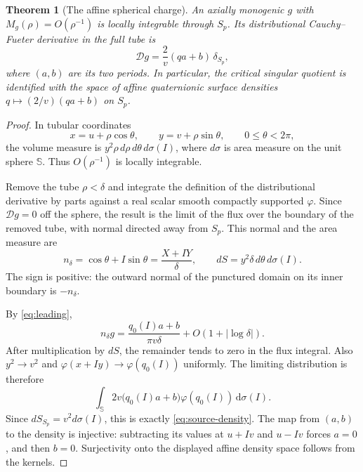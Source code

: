\documentclass[11pt,a4paper]{article}
\numberwithin{equation}{section}
\newtheorem{theorem}{Theorem}[section]
\theoremstyle{definition}
\theoremstyle{remark}
\newcommand{\SSS}{\mathbb S}
\newcommand{\cD}{\mathcal D}
\newcommand{\dd}{\,\mathrm d}
\begin{document}
\begin{theorem}[The affine spherical charge]\label{thm:source}
An axially monogenic $g$ with $M_g(\rho)=O(\rho^{-1})$ is locally integrable
through $S_p$. Its distributional Cauchy--Fueter derivative in the full tube is
\begin{equation}\label{eq:source-density}
 \boxed{\displaystyle
 \cD g=\frac{2}{v}(q a+b)\,\delta_{S_p},}
\end{equation}
where $(a,b)$ are its two periods. In particular, the critical singular quotient
is identified with the space of affine quaternionic surface densities
$q\mapsto(2/v)(qa+b)$ on $S_p$.
\end{theorem}
\begin{proof}
In tubular coordinates
\[
 x=u+\rho\cos\theta,\qquad y=v+\rho\sin\theta,
 \qquad 0\leq\theta<2\pi,
\]
the volume measure is $y^2\rho\,d\rho\,d\theta\,d\sigma(I)$, where
$d\sigma$ is area measure on the unit sphere $\SSS$. Thus $O(\rho^{-1})$
is locally integrable.

Remove the tube $\rho<\delta$ and integrate the definition of the
distributional derivative by parts against a real scalar smooth compactly
supported $\varphi$. Since $\cD g=0$ off the sphere, the result is the limit of
the flux over the boundary of the removed tube, with normal directed away from
$S_p$. This normal and the area measure are
\[
 n_\delta=\cos\theta+I\sin\theta
         =\frac{X+IY}{\delta},\qquad
 dS=y^2\delta\,d\theta\,d\sigma(I).
\]
The sign is positive: the outward normal of the punctured domain on its inner
boundary is $-n_\delta$.

By \eqref{eq:leading},
\[
 n_\delta g=\frac{q_0(I)a+b}{\pi v\delta}
                 +O(1+|\log\delta|).
\]
After multiplication by $dS$, the remainder tends to zero in the flux integral.
Also $y^2\to v^2$ and $\varphi(x+Iy)\to\varphi(q_0(I))$ uniformly. The
limiting distribution is therefore
\[
 \int_{\SSS}2v\bigl(q_0(I)a+b\bigr)\varphi(q_0(I))\dd\sigma(I).
\]
Since $dS_{S_p}=v^2d\sigma(I)$, this is exactly
\eqref{eq:source-density}. The map from $(a,b)$ to the density is injective:
subtracting its values at $u+Iv$ and $u-Iv$ forces $a=0$, and then $b=0$.
Surjectivity onto the displayed affine density space follows from the kernels.
\end{proof}
\end{document}
